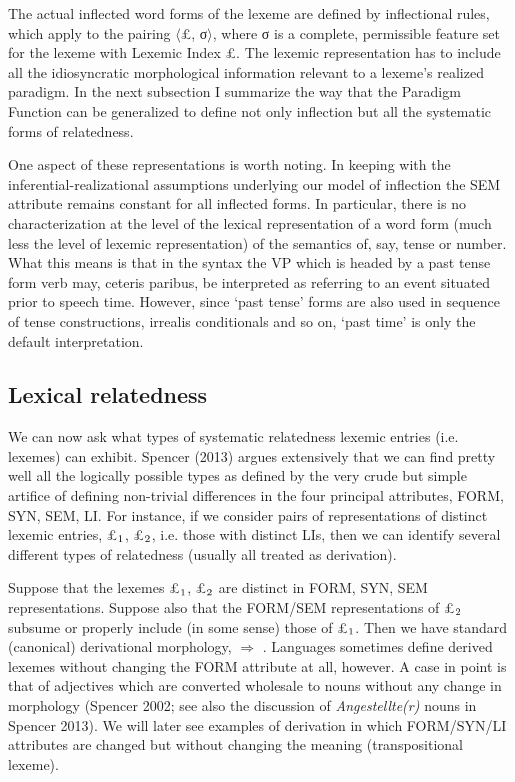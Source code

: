 \documentclass[output=paper,
modfonts
]{LSP/langsci}
\begin{document}
The actual inflected word forms of the lexeme are defined by inflectional rules, which apply to the pairing $\langle$\pounds, σ$\rangle$, where σ is a complete, permissible feature set for the lexeme with Lexemic Index \pounds. The lexemic representation has to include all the idiosyncratic morphological information relevant to a lexeme’s realized paradigm. In the next subsection I summarize the way that the Paradigm Function  can be generalized to define  not only inflection but all the systematic forms of relatedness. 

\begin{sloppypar}One aspect of these representations is worth noting. In keeping with the inferential-realizational assumptions underlying our model of inflection the SEM attribute remains constant for all inflected forms. In particular, there is no characterization at the level of the lexical representation of a word form (much less the level of lexemic representation) of the semantics of, say, tense or number. What this means is that in the syntax the  VP  which is headed by a past tense form verb  may, ceteris paribus, be  interpreted as referring to an event situated prior to speech time. However, since ‘past tense’ forms are also used in sequence of tense constructions, irrealis conditionals and so on, ‘past time’ is only the default interpretation. \end{sloppypar}

\subsection{Lexical relatedness}	\label{sec:lexrel}

We can now ask what types of systematic relatedness lexemic entries (i.e. lexemes) can exhibit. Spencer (2013) argues extensively that we can find pretty well all the logically possible types as defined by the very crude but simple artifice of defining non-trivial differences in the four principal attributes, FORM, SYN, SEM, LI. For instance, if we consider  pairs of representations of distinct lexemic entries, \pounds$\sb{1}$, \pounds$\sb{2}$, i.e. those with distinct LIs, then we can identify several different types of relatedness (usually all treated as derivation). 

Suppose that the lexemes \pounds$\sb{1}$, \pounds$\sb{2}$ are distinct in FORM, SYN, SEM representations. Suppose also that the FORM/SEM representations of \pounds$\sb{2}$ subsume or properly include (in some sense) those of \pounds$\sb{1}$. Then we have standard (canonical) derivational morphology,  $\Rightarrow$ . %
Languages sometimes define derived lexemes without changing the FORM attribute at all, however. %
A case in point is that of adjectives which are converted wholesale to nouns without any change in morphology (Spencer 2002; 
\nocite{Spencer02:gender}
see also the discussion of \textit{Angestellte(r)} nouns in Spencer 2013). We will later see examples of derivation in which FORM/SYN/LI attributes are changed but without changing the meaning (transpositional lexeme). 
\end{document}
